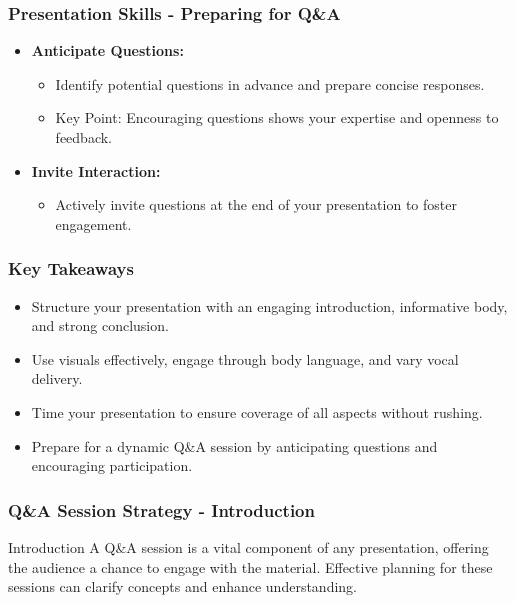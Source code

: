 \documentclass[aspectratio=169]{beamer}
\begin{document}
\begin{frame}[fragile]
    \frametitle{Presentation Skills - Preparing for Q\&A}
    \begin{itemize}
        \item \textbf{Anticipate Questions:} 
        \begin{itemize}
            \item Identify potential questions in advance and prepare concise responses.
            \item Key Point: Encouraging questions shows your expertise and openness to feedback.
        \end{itemize}

        \item \textbf{Invite Interaction:} 
        \begin{itemize}
            \item Actively invite questions at the end of your presentation to foster engagement.
        \end{itemize}
    \end{itemize}
\end{frame}

\begin{frame}[fragile]
    \frametitle{Key Takeaways}
    \begin{itemize}
        \item Structure your presentation with an engaging introduction, informative body, and strong conclusion.
        \item Use visuals effectively, engage through body language, and vary vocal delivery.
        \item Time your presentation to ensure coverage of all aspects without rushing.
        \item Prepare for a dynamic Q\&A session by anticipating questions and encouraging participation.
    \end{itemize}
\end{frame}

\begin{frame}[fragile]
    \frametitle{Q\&A Session Strategy - Introduction}
    \begin{block}{Introduction}
        A Q\&A session is a vital component of any presentation, offering the audience a chance to engage with the material. 
        Effective planning for these sessions can clarify concepts and enhance understanding.
    \end{block}
\end{frame}
\end{document}
